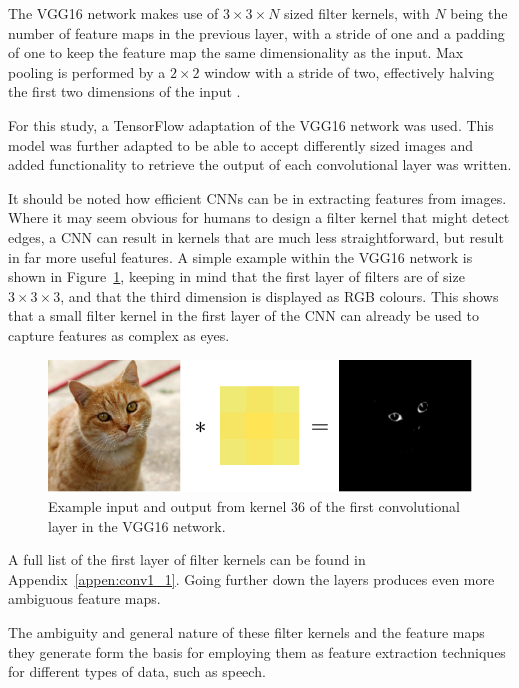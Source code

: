 The VGG16 network makes use of $3\times3\times N$ sized filter kernels, with $N$ being the number of feature maps in the previous layer, with a stride of one and a padding of one to keep the feature map the same dimensionality as the input.
Max pooling is performed by a $2\times2$ window with a stride of two, effectively halving the first two dimensions of the input \cite{DBLP:journals/corr/SimonyanZ14a}.

For this study, a TensorFlow adaptation of the VGG16 network was used\cite{frossard_2016}.
This model was further adapted to be able to accept differently sized images and added functionality to retrieve the output of each convolutional layer was written.

It should be noted how efficient CNNs can be in extracting features from images.
Where it may seem obvious for humans to design a filter kernel that might detect edges, a CNN can result in kernels that are much less straightforward, but result in far more useful features.
A simple example within the VGG16 network is shown in Figure~\ref{fig:filter_36}, keeping in mind that the first layer of filters are of size $3\times3\times3$, and that the third dimension is displayed as RGB colours.
This shows that a small filter kernel in the first layer of the CNN can already be used to capture features as complex as eyes.

\begin{figure}
    \centering
    \includegraphics[width=0.6\linewidth]{content/fig/kernel36.png}
    \caption{Example input and output from  kernel 36 of the first convolutional layer in the VGG16 network.}
    \label{fig:filter_36}
\end{figure}

A full list of the first layer of filter kernels can be found in Appendix~\ref{appen:conv1_1}.
Going further down the layers produces even more ambiguous feature maps. 


The ambiguity and general nature of these filter kernels and the feature maps they generate form the basis for employing them as feature extraction techniques for different types of data, such as speech.